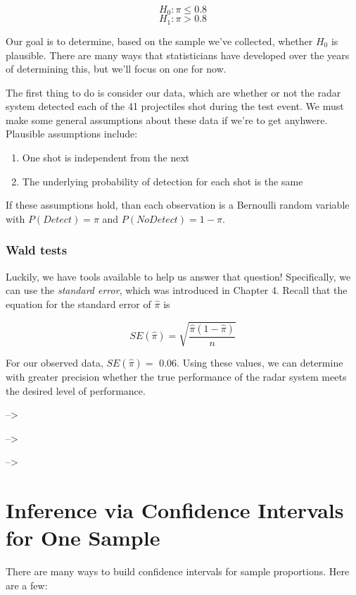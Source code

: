 \documentclass[
]{book}
\providecommand{\tightlist}{%
  \setlength{\itemsep}{0pt}\setlength{\parskip}{0pt}}
\theoremstyle{definition}
\theoremstyle{definition}
\theoremstyle{definition}
\theoremstyle{remark}
\begin{document}
\[H_0: \pi \le 0.8\]
\[H_1: \pi > 0.8\]

Our goal is to determine, based on the sample we've collected, whether \(H_0\) is plausible. There are many ways that statisticians have developed over the years of determining this, but we'll focus on one for now.

The first thing to do is consider our data, which are whether or not the radar system detected each of the 41 projectiles shot during the test event. We must make some general assumptions about these data if we're to get anyhwere. Plausible assumptions include:

\begin{enumerate}
\def\labelenumi{\arabic{enumi}.}
\tightlist
\item
  One shot is independent from the next
\item
  The underlying probability of detection for each shot is the same
\end{enumerate}

If these assumptions hold, than each observation is a Bernoulli random variable with \(P(Detect) = \pi\) and \(P(NoDetect) = 1 - \pi\).

\hypertarget{wald-tests}{%
\subsection{Wald tests}\label{wald-tests}}

Luckily, we have tools available to help us answer that question! Specifically, we can use the \emph{standard error}, which was introduced in Chapter 4. Recall that the equation for the standard error of \(\hat\pi\) is

\[SE(\hat\pi) = \sqrt{\frac{\hat\pi (1 - \hat\pi)}{n}}\]

For our observed data, \(SE(\hat\pi) =\) 0.06. Using these values, we can determine with greater precision whether the true performance of the radar system meets the desired level of performance.

--\textgreater{}

--\textgreater{}

--\textgreater{}

\hypertarget{CI}{%
\chapter{Inference via Confidence Intervals for One Sample}\label{CI}}

There are many ways to build confidence intervals for sample proportions. Here are a few:
\end{document}
